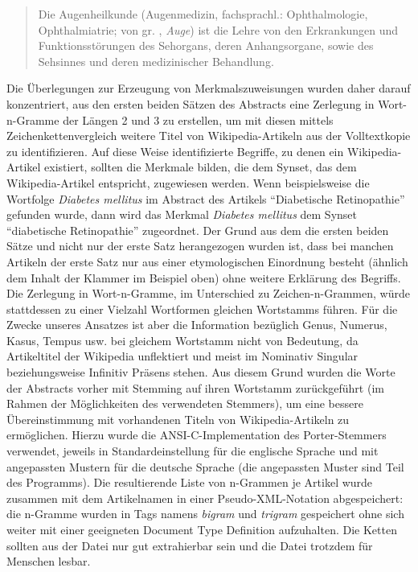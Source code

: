 \documentclass[pagesize,DIV=calc,12pt,final]{scrreprt}
\begin{document}
\begin{quote}
Die Augenheilkunde (Augenmedizin, fachsprachl.: Ophthalmologie, Ophthalmiatrie; von gr. \textomikron\textphi\texttheta\textalpha\textlambda\textmugreek\textomikron\textvarsigma, \emph{Auge}) ist die Lehre von den Erkrankungen und Funktionsstörungen des Sehorgans, deren Anhangsorgane, sowie des Sehsinnes und deren medizinischer Behandlung. 
\end{quote}

Die Überlegungen zur Erzeugung von Merkmalszuweisungen wurden daher darauf konzentriert, aus den ersten beiden Sätzen des Abstracts eine Zerlegung in Wort-n-Gramme der Längen 2 und 3 zu erstellen, um mit diesen mittels Zeichenkettenvergleich weitere Titel von Wikipedia-Artikeln aus der Volltextkopie zu identifizieren.
Auf diese Weise identifizierte Begriffe, zu denen ein Wikipedia-Artikel existiert, sollten die Merkmale bilden, die dem Synset, das dem Wikipedia-Artikel entspricht, zugewiesen werden. 
Wenn beispielsweise die Wortfolge \textit{Diabetes mellitus} im Abstract des Artikels \enquote{Diabetische Retinopathie} gefunden wurde, dann wird das Merkmal \textit{Diabetes mellitus} dem Synset \enquote{diabetische Retinopathie} zugeordnet.
Der Grund aus dem die ersten beiden Sätze und nicht nur der erste Satz herangezogen wurden ist, dass bei manchen Artikeln der erste Satz nur aus einer etymologischen Einordnung besteht (ähnlich dem Inhalt der Klammer im Beispiel oben) ohne weitere Erklärung des Begriffs. 
Die Zerlegung in Wort-n-Gramme, im Unterschied zu Zeichen-n-Grammen, würde stattdessen zu einer Vielzahl Wortformen gleichen Wortstamms führen.
Für die Zwecke unseres Ansatzes ist aber die Information bezüglich Genus, Numerus, Kasus, Tempus usw. bei gleichem Wortstamm nicht von Bedeutung, da Artikeltitel der Wikipedia unflektiert und meist im Nominativ Singular beziehungsweise Infinitiv Präsens stehen.
Aus diesem Grund wurden die Worte der Abstracts vorher mit Stemming auf ihren Wortstamm zurückgeführt (im Rahmen der Möglichkeiten des verwendeten Stemmers), um eine bessere Übereinstimmung mit vorhandenen Titeln von Wikipedia-Artikeln zu ermöglichen.
Hierzu wurde die ANSI-C-Implementation des Porter-Stemmers verwendet, jeweils in Standardeinstellung für die englische Sprache und mit angepassten Mustern für die deutsche Sprache (die angepassten Muster sind Teil des Programms). 
Die resultierende Liste von n-Grammen je Artikel wurde zusammen mit dem Artikelnamen in einer Pseudo-XML-Notation abgespeichert: die n-Gramme wurden in Tags namens \emph{bigram} und \emph{trigram} gespeichert ohne sich weiter mit einer geeigneten Document Type Definition aufzuhalten. 
Die Ketten sollten aus der Datei nur gut extrahierbar sein und die Datei trotzdem für Menschen lesbar.
\end{document}
